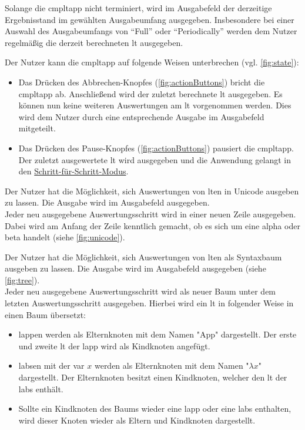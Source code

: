 \documentclass[parskip=full,11pt,twoside]{scrartcl}
\begin{document}
Solange die \gls{cmpltapp} nicht terminiert, wird im Ausgabefeld der derzeitige Ergebnisstand im gewählten Ausgabeumfang ausgegeben. 
Insbesondere bei einer Auswahl des Ausgabeumfangs von ``Full'' oder ``Periodically'' werden dem Nutzer regelmäßig die derzeit berechneten \gls{lt} ausgegeben.

Der Nutzer kann die \gls{cmpltapp} auf folgende Weisen unterbrechen (vgl. \cref{fig:state}):
\begin{itemize}
	\item Das Drücken des Abbrechen-Knopfes (\cref{fig:actionButtons}) bricht die \gls{cmpltapp} ab. 
	Anschließend wird der zuletzt berechnete \gls{lt} ausgegeben. Es können nun keine weiteren Auswertungen am \gls{lt} vorgenommen werden. 
	Dies wird dem Nutzer durch eine entsprechende Ausgabe im Ausgabefeld mitgeteilt.
	\item Das Drücken des Pause-Knopfes (\cref{fig:actionButtons}) pausiert die \gls{cmpltapp}. 
	Der zuletzt ausgewertete \gls{lt} wird ausgegeben und die Anwendung gelangt in den \hyperref[fnc:steps]{Schritt-für-Schritt-Modus}.
\end{itemize}

Der Nutzer hat die Möglichkeit, sich Auswertungen von \gls{lt}en in Unicode ausgeben zu lassen. Die Ausgabe wird im Ausgabefeld ausgegeben.\\
Jeder neu ausgegebene Auswertungsschritt wird in einer neuen Zeile ausgegeben. 
Dabei wird am Anfang der Zeile kenntlich gemacht, ob es sich um eine \gls{alpha} oder \gls{beta} handelt (siehe \cref{fig:unicode}).

Der Nutzer hat die Möglichkeit, sich Auswertungen von \gls{lt}en als Syntaxbaum ausgeben zu lassen. Die Ausgabe wird im Ausgabefeld ausgegeben (siehe \cref{fig:tree}).\\
Jeder neu ausgegebene Auswertungsschritt wird als neuer Baum unter dem letzten Auswertungsschritt ausgegeben. Hierbei wird ein \gls{lt} in folgender Weise in einen Baum übersetzt:
\begin{itemize}
	\item \gls{lapp}en werden als Elternknoten mit dem Namen "App" dargestellt. 
	Der erste und zweite \gls{lt} der \gls{lapp} wird als Kindknoten angefügt.
	\item \gls{labs}en mit der \gls{var} $x$ werden als Elternknoten mit dem Namen "$\lambda x$" dargestellt. 
	Der Elternknoten besitzt einen Kindknoten, welcher den \gls{lt} der \gls{labs} enthält.
	\item Sollte ein Kindknoten des Baums wieder eine \gls{lapp} oder eine \gls{labs} enthalten, wird dieser Knoten wieder als Eltern und Kindknoten dargestellt.
\end{itemize}
\end{document}
